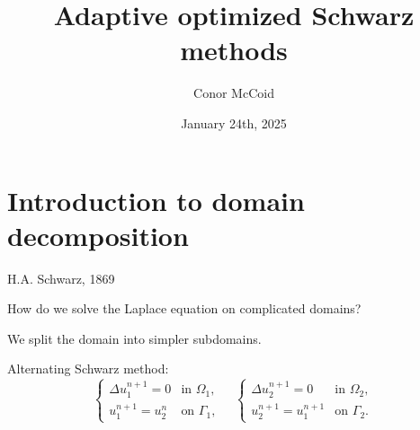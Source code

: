\documentclass{beamer}
\title{Adaptive optimized Schwarz methods}
\author{Conor McCoid}
\institute{McMaster University}
\date{January 24th, 2025}
\begin{document}
\maketitle

\section{Introduction to domain decomposition} %

\begin{frame}{H.A. Schwarz, 1869}

How do we solve the Laplace equation on complicated domains?

We split the domain into simpler subdomains.

\begin{figure}
	\centering
\end{figure}

Alternating Schwarz method:
\begin{equation*}
	\begin{cases} \Delta u_1^{n+1} = 0 & \text{in } \Omega_1, \\ u_1^{n+1} = u_2^n & \text{on } \Gamma_1, \end{cases}
	\quad
	\begin{cases} \Delta u_2^{n+1} = 0 & \text{in } \Omega_2, \\ u_2^{n+1} = u_1^{n+1} & \text{on } \Gamma_2. \end{cases}
\end{equation*}
\end{frame}
\end{document}
